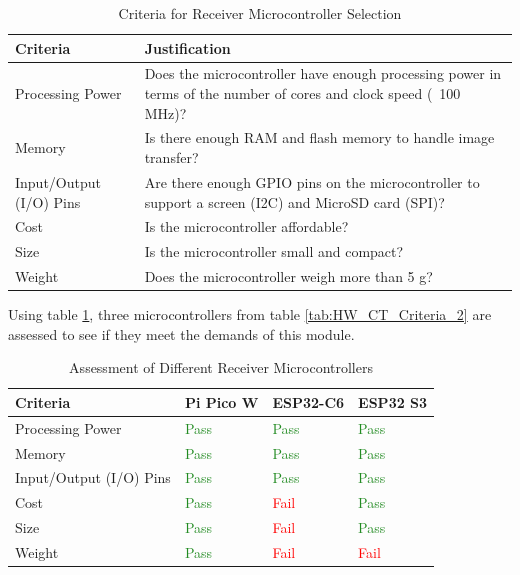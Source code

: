 \documentclass[class=report,11pt,crop=false]{standalone}
\begin{document}
\begin{table}[h]
\centering
\begin{tabular}{|l|p{10cm}|}
\hline
\textbf{Criteria} & \textbf{Justification} \\
\hline
Processing Power & Does the microcontroller have enough processing power in terms of the number of cores and clock speed (~100 MHz)? \\
\hline
Memory & Is there enough RAM and flash memory to handle image transfer? \\
\hline
Input/Output (I/O) Pins & Are there enough GPIO pins on the microcontroller to support a screen (I2C) and MicroSD card (SPI)? \\
\hline
Cost & Is the microcontroller affordable? \\
\hline
Size & Is the microcontroller small and compact? \\
\hline
Weight & Does the microcontroller weigh more than 5 g? \\
\hline
\end{tabular}
\caption{Criteria for Receiver Microcontroller Selection}
\label{tab:HW_R_Criteria}
\end{table}

Using table \ref{tab:HW_R_Criteria}, three microcontrollers from table \ref{tab:HW_CT_Criteria_2} are assessed to see if they meet the demands of this module.

\begin{table}[h]
\centering
\begin{tabular}{|l|l|l|l|}
\hline
\textbf{Criteria} & \textbf{Pi Pico W} & \textbf{ESP32-C6} & \textbf{ESP32 S3} \\
\hline
Processing Power & \textcolor{ForestGreen}{Pass} & \textcolor{ForestGreen}{Pass} & \textcolor{ForestGreen}{Pass} \\
\hline
Memory & \textcolor{ForestGreen}{Pass} & \textcolor{ForestGreen}{Pass} & \textcolor{ForestGreen}{Pass} \\
\hline
Input/Output (I/O) Pins & \textcolor{ForestGreen}{Pass} & \textcolor{ForestGreen}{Pass} & \textcolor{ForestGreen}{Pass} \\
\hline
Cost & \textcolor{ForestGreen}{Pass} & \textcolor{red}{Fail} & \textcolor{ForestGreen}{Pass} \\
\hline
Size & \textcolor{ForestGreen}{Pass} & \textcolor{red}{Fail} & \textcolor{ForestGreen}{Pass} \\
\hline
Weight & \textcolor{ForestGreen}{Pass} & \textcolor{red}{Fail} & \textcolor{red}{Fail} \\
\hline
\end{tabular}
\caption{Assessment of Different Receiver Microcontrollers}
\label{tab:HW_R_Result}
\end{table}
\end{document}
